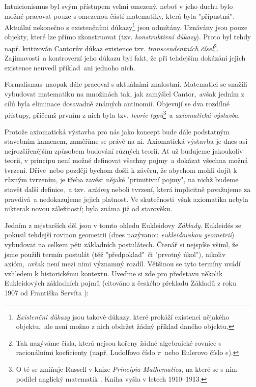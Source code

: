 Intuicionismus byl svým přístupem velmi omezený, neboť v jeho duchu bylo možné pracovat pouze s omezenou částí matematiky, která byla "přípustná". Aktuální nekonečno s existenčními důkazy\footnote{\emph{Existenční důkazy} jsou takové důkazy, které prokáží existenci nějakého objektu,~ale není možno z nich obdržet žádný příklad daného objektu.} jsou odmítány. Uznávány jsou pouze objekty, které lze přímo zkonstruovat (tzv. \emph{konstruktivní důkazy}). Proto byl tehdy např. kritizován Cantorův důkaz existence tzv. \emph{transcendentních čísel}\footnote{Tak nazýváme čísla, která nejsou kořeny žádné algebraické rovnice s racionálními koeficienty (např. Ludolfovo číslo $\pi$~nebo Eulerovo číslo $e$).}. Zajímavostí~a kontroverzí jeho důkazu byl fakt, že při tehdejším dokázání jejich existence neuvedl příklad~ani jednoho nich.\par
Formalismus~naopak dále pracoval s aktuálními znalostmi. Matematici se snažili vybudovat matematiku na množinách tak, jak zamýšlel Cantor,~avšak jedním z cílů byla eliminace dosavadně známých antinomií. Objevují se dva rozdílné přístupy, přičemž prvním z nich byla tzv. \emph{teorie typů}\footnote{O té se zmiňuje Russell v knize \emph{Principia Mathematica}, na které se s ním podílel anglický matematik . Kniha vyšla v letech 1910--1913.}~a \emph{axiomatická výstavba}.\par
Protože axiomatická výstavba pro nás jako koncept bude dále podstatným stavebním kamenem, zaměříme se právě na ni. Axiomatická výstavba je dnes asi nejrozšířenějším způsobem budování různých teorií. Ať už budujeme jakoukoliv teorii, v principu není možné definovat všechny pojmy~a dokázat všechna možná tvrzení. Dříve~nebo později bychom došli k závěru, že abychom mohli dojít k různým tvrzením, je třeba zavést nějaké "primitivní pojmy", na nichž budeme stavět další definice,~a tzv. \emph{axiómy} neboli tvrzení, která implicitně považujeme za pravdivá~a nedokazujeme jejich platnost. Ve skutečnosti~však axiomatika nebyla nikterak novou záležitostí; byla známa již od starověku.\par
Jedním z nejstarších děl jsou v tomto ohledu Eukleidovy \emph{Základy}. Eukleidés se pokusil tehdejší rovinou geometrii (dnes nazývanou \emph{eukleidovskou geometrií}) vybudovat na celkem pěti základních postulátech. Čtenář si nejspíše všiml, že jsme použili termín postulát (též "předpoklad"~či "prvotný úkol"), nikoliv axióm,~avšak není mezi nimi významný rozdíl. Většinou se tyto termíny uvádí vzhledem k historickému kontextu. Uveďme si zde pro představu několik Eukleidových základních pojmů (citováno z českého překladu Základů z roku 1907 od Františka Servíta \cite{Eukleides1907}):

